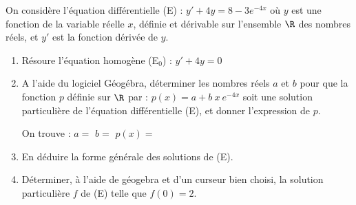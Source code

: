 On considère l’équation différentielle (E) : $y' + 4y = 8-3e^{-4x}$ où $y$ est une fonction de la variable réelle $x$, définie et dérivable sur l’ensemble $\R$ des nombres réels, et $y'$ est la fonction dérivée de $y$.

\begin{enumerate}
	\item Résoure l'équation homogène (E$_0$) : $y'+4y=0$\sautp

	\item A l’aide du logiciel Géogébra, déterminer les nombres réels $a$ et $b$ pour que la fonction $p$ définie sur $\R$ par : $p(x) = a + b~x~e^{-4x}$ soit une solution particulière de l'équation différentielle (E), et donner l’expression de $p$. \sautm
	
	On trouve : $a=$\makebox[0.1\linewidth]{\dotfill} \hfill $b=$\makebox[0.1\linewidth]{\dotfill} \hfill $p(x)=$\makebox[0.3\linewidth]{\dotfill}\sauts
	\item En déduire la forme générale des solutions de (E).\sautp

	\item Déterminer, à l'aide de géogebra et d'un curseur bien choisi, la solution particulière $f$ de (E) telle que $f(0)=2$.\sautp

\end{enumerate}